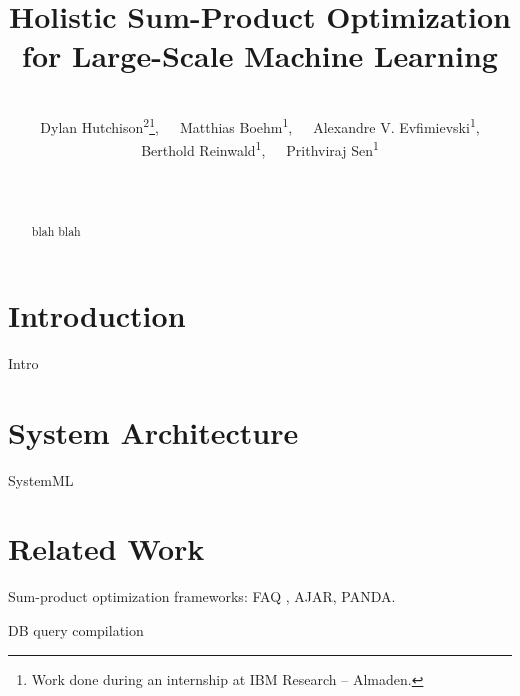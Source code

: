 \documentclass{vldb}
\begin{document}
\title{Holistic Sum-Product Optimization\\for Large-Scale Machine Learning}

\author{
  \alignauthor 
	~\vspace{-0.7cm}\\
	Dylan Hutchison\textsuperscript{2}\thanks{Work done during an internship at IBM Research -- Almaden.},~~~Matthias Boehm\textsuperscript{1},~~~Alexandre V. Evfimievski\textsuperscript{1},\vspace{0.1cm}\\
  Berthold Reinwald\textsuperscript{1},~~~Prithviraj Sen\textsuperscript{1}\\~\\
  \\
}

\maketitle

\begin{abstract}
blah blah
\end{abstract}

\section{Introduction}

Intro

\section{System Architecture}
\label{sec:sysarch}

SystemML

\section{Related Work}
\label{sec:rwork}

Sum-product optimization frameworks: FAQ \cite{KhamisNR16}, AJAR, PANDA.

DB query compilation
\end{document}

